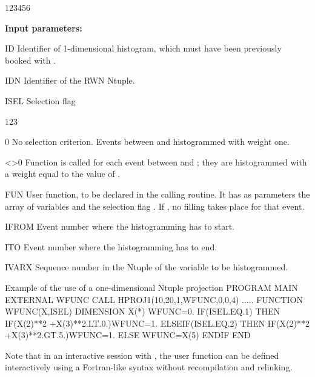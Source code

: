 \begin{DLttc}{123456}
\item[{\rm\bf Input parameters:}]
\item[ID]    Identifier of 1-dimensional histogram, which
             must have been previously booked with .
\item[IDN]   Identifier of the RWN Ntuple.
\item[ISEL]  Selection flag
             \begin{DLttc}{123}
                \item[0]   No selection criterion.
                           Events between  and
                            histogrammed with weight one.
                \item[<>0] Function  is called for each event
                           between  and ;
                           they are histogrammed
                           with a weight equal to the value of .
             \end{DLttc}
\item[FUN]   User function, to be declared  in the calling
             routine.
             It has as parameters the array of variables  and the
             selection flag . If ,
             no filling takes place for that event.
\item[IFROM] Event number where the histogramming has to start.
\item[ITO]   Event number where the histogramming has to end.
\item[IVARX] Sequence number in the Ntuple of the variable to be
             histogrammed.
\end{DLttc}

\begin{XMPt}{Example of the use of a one-dimensional Ntuple projection}
     PROGRAM MAIN
     EXTERNAL WFUNC
     CALL HPROJ1(10,20,1,WFUNC,0,0,4)
     .....
     FUNCTION WFUNC(X,ISEL)
     DIMENSION X(*)
     WFUNC=0.
     IF(ISEL.EQ.1)     THEN
              IF(X(2)**2 +X(3)**2.LT.0.)WFUNC=1.
     ELSEIF(ISEL.EQ.2) THEN
              IF(X(2)**2 +X(3)**2.GT.5.)WFUNC=1.
     ELSE     WFUNC=X(5)
     ENDIF
     END
\end{XMPt}

\finalnewpage

Note that in an interactive session with \PAW{},
the user function  can be defined
interactively using a Fortran-like syntax without recompilation
and relinking.

